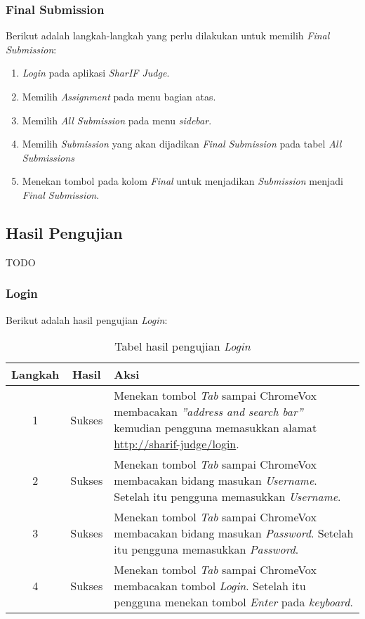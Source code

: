 \subsubsection{Final Submission}
\label{subsubsec:skenario_final_submission}
Berikut adalah langkah-langkah yang perlu dilakukan untuk memilih \textit{Final Submission}:

\begin{enumerate}
	\item \textit{Login} pada aplikasi \textit{SharIF Judge}.
	\item Memilih \textit{Assignment} pada menu bagian atas.
	\item Memilih \textit{All Submission} pada menu \textit{sidebar}.
	\item Memilih \textit{Submission} yang akan dijadikan \textit{Final Submission} pada tabel \textit{All Submissions}
	\item Menekan tombol pada kolom \textit{Final} untuk menjadikan \textit{Submission} menjadi \textit{Final Submission}.
\end{enumerate}

\subsection{Hasil Pengujian}
\label{subsec:hasil_pengujian}
TODO

\subsubsection{Login}
\label{subsubsec:hasil_login}
Berikut adalah hasil pengujian \textit{Login}:

\begin{table}[H]
	\centering
	\caption{Tabel hasil pengujian \textit{Login}}
	\label{tab:hasil_login}
	\begin{tabular}{|c|c|p{12cm}|}
		\toprule
		Langkah & Hasil & Aksi\\
		\midrule
		1 & Sukses & Menekan tombol \textit{Tab} sampai ChromeVox membacakan \textit{''address and search bar''} kemudian pengguna memasukkan alamat \url{http://sharif-judge/login}.\\
		2 & Sukses & Menekan tombol \textit{Tab} sampai ChromeVox membacakan bidang masukan \textit{Username}. Setelah itu pengguna memasukkan \textit{Username}.\\
		3 & Sukses & Menekan tombol \textit{Tab} sampai ChromeVox membacakan bidang masukan \textit{Password}. Setelah itu pengguna memasukkan \textit{Password}. \\
		4 & Sukses & Menekan tombol \textit{Tab} sampai ChromeVox membacakan tombol \textit{Login}. Setelah itu pengguna menekan tombol \textit{Enter} pada \textit{keyboard}.\\
		\bottomrule
	\end{tabular}
\end{table}

